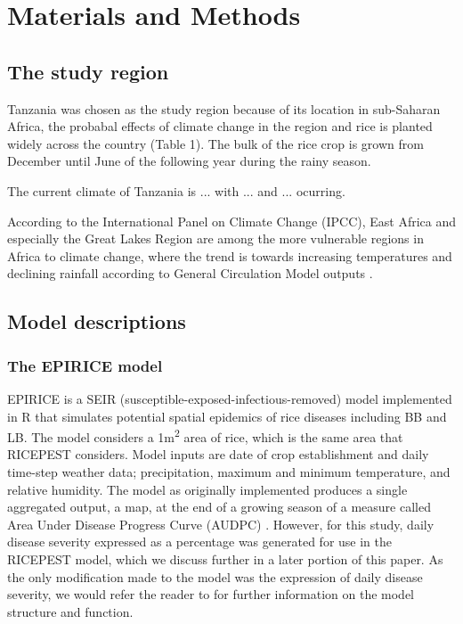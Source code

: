 \documentclass[preprint,12pt]{elsarticle}
\begin{document}
\section{Materials and Methods}


\subsection{The study region}
Tanzania was chosen as the study region because of its location in sub-Saharan Africa, the probabal effects of climate change in the region and rice is planted widely across the country \cite{Rowhani2011} (Table 1). The bulk of the rice crop is grown from December until June of the following year during the rainy season. 

The current climate of Tanzania is ... with ... and ... ocurring. 

According to the International Panel on Climate Change (IPCC), East Africa and especially the Great Lakes Region are among the more vulnerable regions in Africa to climate change, where the trend is towards increasing temperatures and declining rainfall according to General Circulation Model outputs \cite{Boko2007}.

\subsection{Model descriptions}
\subsubsection{The EPIRICE model}
EPIRICE \cite{Savary2012} is a SEIR (susceptible-exposed-infectious-removed) model \cite{Kermack1927, Madden2006} implemented in R \cite{R2014} that simulates potential spatial epidemics of rice diseases including BB and LB. The model considers a 1m\textsuperscript{2} area of rice, which is the same area that RICEPEST considers. Model inputs are date of crop establishment and daily time-step weather data; precipitation, maximum and minimum temperature, and relative humidity. The model as originally implemented produces a single aggregated output, a map, at the end of a growing season of a measure called Area Under Disease Progress Curve (AUDPC) \cite{Shaner1977}. However, for this study, daily disease severity expressed as a percentage was generated for use in the RICEPEST model, which we discuss further in a later portion of this paper. As the only modification made to the model was the expression of daily disease severity, we  would refer the reader to \citet{Savary2012} for further information on the model structure and function.
\end{document}
